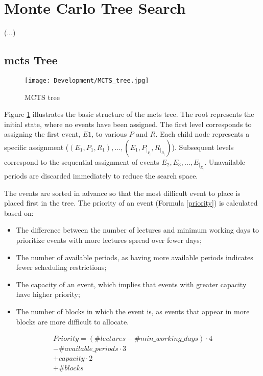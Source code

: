 
\section{Monte Carlo Tree Search}


(...)

\subsection{\ac{mcts} Tree}

\begin{figure}
      \centering
      \texttt{[image: Development/MCTS\_tree.jpg]}
      \caption[MCTS tree]
      {MCTS tree}
      \label{fig:mcts_tree}
\end{figure}

Figure \ref{fig:mcts_tree} illustrates the basic structure of the \ac{mcts} tree. The root represents the initial state, where no events have been assigned. The first level corresponds to assigning the first event, \(E1\), to various \(P\) and \(R\). Each child node represents a specific assignment (\((E_1,P_1,R_1),...,(E_1,P_|_P_|,R_|_R_|)\)). Subsequent levels correspond to the sequential assignment of events \(E_2, E_3, ..., E_|_E_|\). Unavailable periods are discarded immediately to reduce the search space.

The events are sorted in advance so that the most difficult event to place is placed first in the tree. The priority of an event (Formula \ref{priority}) is calculated based on:
\begin{itemize}
\item The difference between the number of lectures and minimum working days to prioritize events with more lectures spread over fewer days;
\item The number of available periods, as having more available periods indicates fewer scheduling restrictions;
\item The capacity of an event, which implies that events with greater capacity have higher priority;
\item The number of blocks in which the event is, as events that appear in more blocks are more difficult to allocate.
\end{itemize}

\begin{equation}
  \begin{aligned}
	Priority = (\#lectures - \#min\_working\_days) \cdot 4 \\
	           - \#available\_periods \cdot 3 \\
	          + capacity \cdot 2 \\
	          + \#blocks\label{priority}
  \end{aligned}
\end{equation}


